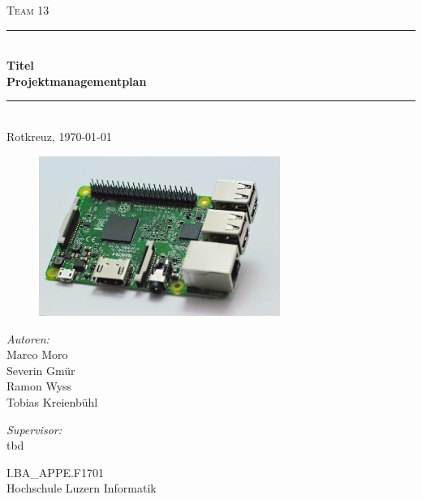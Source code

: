 \begin{titlepage}   

\begin{center}
\textsc{\Large Team 13}\\[0.5cm]

\newcommand{\HRule}{\rule{\linewidth}{0.5mm}}
\HRule \\[0.4cm]
{ \huge \bfseries Titel}\\[0.4cm]
{ \LARGE \bfseries Projektmanagementplan}\\[0.4cm]
\HRule \\[1.5cm]

{\large Rotkreuz, \today}

\begin{figure}[H]%
\centering
\includegraphics[width=0.7\textwidth]{Images/Titelbild.jpg}
\label{fig:title}
\end{figure}
\begin{minipage}{0.4\textwidth}
\begin{flushleft} \large
\emph{Autoren:}\\
Marco Moro\\
Severin Gmür\\
Ramon Wyss\\
Tobias Kreienbühl\\
\end{flushleft}
\end{minipage}
\hfill
\begin{minipage}{0.4\textwidth}
\begin{flushright} \large
\emph{Supervisor:} \\
tbd
\end{flushright}
\end{minipage}
\large
\vfill
I.BA\_APPE.F1701 \\
Hochschule Luzern Informatik

\end{center}

\end{titlepage}